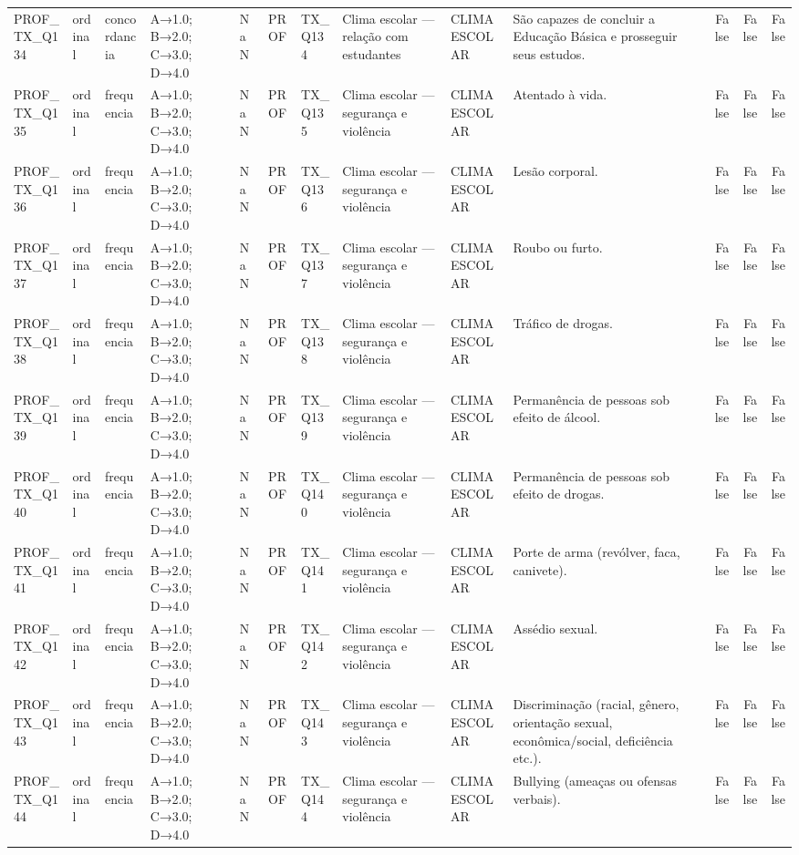 \begin{tabular}{llllllllllrrr}
PROF\_TX\_Q134 & ordinal & concordancia & A→1.0; B→2.0; C→3.0; D→4.0 & NaN & PROF & TX\_Q134 & Clima escolar — relação com estudantes & CLIMA ESCOLAR & São capazes de concluir a Educação Básica e prosseguir seus estudos. & False & False & False \\
PROF\_TX\_Q135 & ordinal & frequencia & A→1.0; B→2.0; C→3.0; D→4.0 & NaN & PROF & TX\_Q135 & Clima escolar — segurança e violência & CLIMA ESCOLAR & Atentado à vida. & False & False & False \\
PROF\_TX\_Q136 & ordinal & frequencia & A→1.0; B→2.0; C→3.0; D→4.0 & NaN & PROF & TX\_Q136 & Clima escolar — segurança e violência & CLIMA ESCOLAR & Lesão corporal. & False & False & False \\
PROF\_TX\_Q137 & ordinal & frequencia & A→1.0; B→2.0; C→3.0; D→4.0 & NaN & PROF & TX\_Q137 & Clima escolar — segurança e violência & CLIMA ESCOLAR & Roubo ou furto. & False & False & False \\
PROF\_TX\_Q138 & ordinal & frequencia & A→1.0; B→2.0; C→3.0; D→4.0 & NaN & PROF & TX\_Q138 & Clima escolar — segurança e violência & CLIMA ESCOLAR & Tráfico de drogas. & False & False & False \\
PROF\_TX\_Q139 & ordinal & frequencia & A→1.0; B→2.0; C→3.0; D→4.0 & NaN & PROF & TX\_Q139 & Clima escolar — segurança e violência & CLIMA ESCOLAR & Permanência de pessoas sob efeito de álcool. & False & False & False \\
PROF\_TX\_Q140 & ordinal & frequencia & A→1.0; B→2.0; C→3.0; D→4.0 & NaN & PROF & TX\_Q140 & Clima escolar — segurança e violência & CLIMA ESCOLAR & Permanência de pessoas sob efeito de drogas. & False & False & False \\
PROF\_TX\_Q141 & ordinal & frequencia & A→1.0; B→2.0; C→3.0; D→4.0 & NaN & PROF & TX\_Q141 & Clima escolar — segurança e violência & CLIMA ESCOLAR & Porte de arma (revólver, faca, canivete). & False & False & False \\
PROF\_TX\_Q142 & ordinal & frequencia & A→1.0; B→2.0; C→3.0; D→4.0 & NaN & PROF & TX\_Q142 & Clima escolar — segurança e violência & CLIMA ESCOLAR & Assédio sexual. & False & False & False \\
PROF\_TX\_Q143 & ordinal & frequencia & A→1.0; B→2.0; C→3.0; D→4.0 & NaN & PROF & TX\_Q143 & Clima escolar — segurança e violência & CLIMA ESCOLAR & Discriminação (racial, gênero, orientação sexual, econômica/social, deficiência etc.). & False & False & False \\
PROF\_TX\_Q144 & ordinal & frequencia & A→1.0; B→2.0; C→3.0; D→4.0 & NaN & PROF & TX\_Q144 & Clima escolar — segurança e violência & CLIMA ESCOLAR & Bullying (ameaças ou ofensas verbais). & False & False & False \\

\end{tabular}
